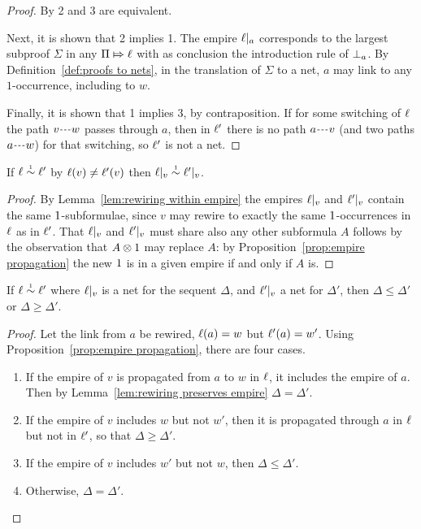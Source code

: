 \documentclass{sigplanconf}
\begin{document}
\begin{proof}
By \cite[Proposition 2.a]{Bellin-vandeWiele-1995} 2 and 3 are equivalent.

Next, it is shown that 2 implies 1.
%
The empire $\emp a$ corresponds to the largest subproof $\Sigma$ in any $\Pi\Mapsto\ell$ with as conclusion the introduction rule of $\bot_{a}$.
%
By Definition~\ref{def:proofs to nets}, in the translation of $\Sigma$ to a net, $a$ may link to any $1$-occurrence, including to $w$.



Finally, it is shown that 1 implies 3, by contraposition.
%
If for some switching of $\ell$ the path $\path vw$ passes through $a$, then in $\ell'$ there is no path $\path av$ (and two paths $\path aw$) for that switching, so $\ell'$ is not a net.
%
\end{proof}


\begin{lemma}
\label{lem:rewiring preserves empire}
If $\links\perm*\links'$ by $\ell(v)\neq\ell'(v)$ then $\emp v\perm*\emp*v$.
\end{lemma}

\begin{proof}
By Lemma~\ref{lem:rewiring within empire} the empires $\emp v$ and $\emp*v$ contain the same $1$-subformulae, since $v$ may rewire to exactly the same $1$-occurrences in $\ell$ as in $\ell'$.
%
That $\emp v$ and $\emp*v$ must share also any other subformula $A$ follows by the observation that $A\otimes1$ may replace $A$: by Proposition~\ref{prop:empire propagation} the new $1$ is in a given empire if and only if $A$ is.
%
\end{proof}


\begin{lemma}
\label{lem:rewiring affects empires}
If $\links\perm*\links'$ where $\emp v$ is a net for the sequent $\Delta$, and $\emp*v$ a net for $\Delta'$, then $\Delta\leq\Delta'$ or $\Delta\geq\Delta'$.
\end{lemma}


\begin{proof}
Let the link from $a$ be rewired, $\ell(a)=w$ but $\ell'(a)=w'$.
%
Using Proposition~\ref{prop:empire propagation}, there are four cases.
%
\begin{enumerate}
	\item
If the empire of $v$ is propagated from $a$ to $w$ in $\ell$, it includes the empire of $a$.
%
Then by Lemma~\ref{lem:rewiring preserves empire} $\Delta=\Delta'$.

	\item
If the empire of $v$ includes $w$ but not $w'$, then it is propagated through $a$ in $\ell$ but not in $\ell'$, so that $\Delta\geq\Delta'$.

	\item
If the empire of $v$ includes $w'$ but not $w$, then $\Delta\leq\Delta'$.

	\item
Otherwise, $\Delta=\Delta'$.
\end{enumerate}
\vskip-12pt
\end{proof}
\end{document}
